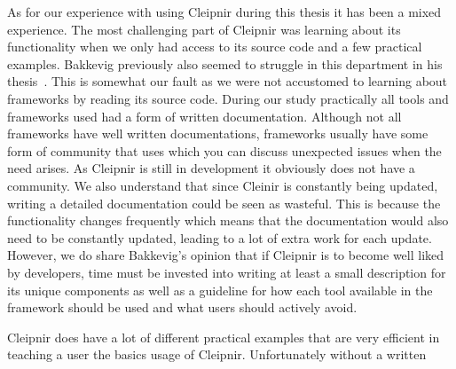 As for our experience with using Cleipnir during this thesis it has been a mixed experience. The most challenging part of Cleipnir was learning about its functionality when we only had access to its source code and a few practical examples. Bakkevig previously also seemed to struggle in this department in his thesis~\cite[p.~43-44]{PAPER:EivindPaper}. This is somewhat our fault as we were not accustomed to learning about frameworks by reading its source code. During our study practically all tools and frameworks used had a form of written documentation. Although not all frameworks have well written documentations, frameworks usually have some form of community that uses which you can discuss unexpected issues when the need arises. As Cleipnir is still in development it obviously does not have a community. We also understand that since Cleinir is constantly being updated, writing a detailed documentation could be seen as wasteful. This is because the functionality changes frequently which means that the documentation would also need to be constantly updated, leading to a lot of extra work for each update. However, we do share Bakkevig's opinion that if  Cleipnir is to become well liked by developers, time must be invested into writing at least a small description for its unique components as well as a guideline for how each tool available in the framework should be used and what users should actively avoid. 

Cleipnir does have a lot of different practical examples that are very efficient in teaching a user the basics usage of Cleipnir. Unfortunately without a written 